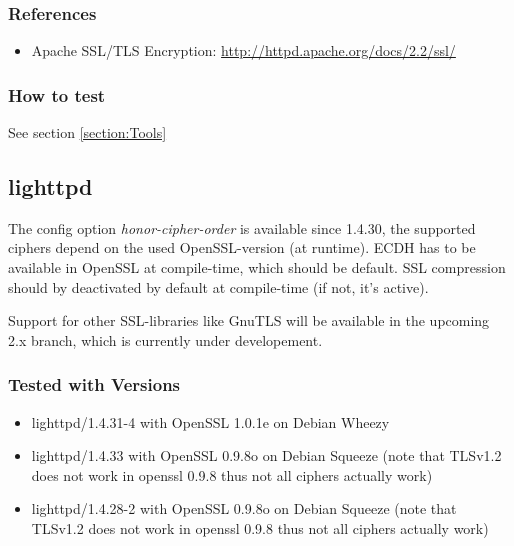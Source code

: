 \subsubsection{References}
\begin{itemize}
	\item Apache SSL/TLS Encryption: \url{http://httpd.apache.org/docs/2.2/ssl/}
\end{itemize}

\subsubsection{How to test}

See section \ref{section:Tools}



\subsection{lighttpd}



The config option \emph{honor-cipher-order} is available since 1.4.30, the supported ciphers depend on the used OpenSSL-version (at runtime). ECDH has to be available in OpenSSL at compile-time, which should be default. SSL compression should by deactivated by default at compile-time (if not, it's active).

Support for other SSL-libraries like GnuTLS will be available in the upcoming 2.x branch, which is currently under developement.

\subsubsection{Tested with Versions}
\begin{itemize}
\item lighttpd/1.4.31-4 with OpenSSL 1.0.1e on Debian Wheezy
\item lighttpd/1.4.33 with OpenSSL 0.9.8o on Debian Squeeze (note that TLSv1.2 does not work in openssl 0.9.8 thus not all ciphers actually work)
\item lighttpd/1.4.28-2 with OpenSSL 0.9.8o on Debian Squeeze (note that TLSv1.2 does not work in openssl 0.9.8 thus not all ciphers actually work)
\end{itemize}

